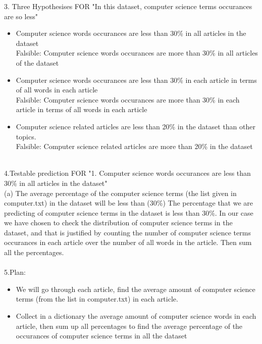 \documentclass{WeSTassignment}
\begin{document}
3. Three Hypothesises FOR "In this dataset, computer science terms occurances are so less" \\
\begin{itemize}
\item Computer science words occurances are less than 30\% in all articles in the dataset \\
Falsible: Computer science words occurances are more than 30\% in all articles of the dataset \\
\item Computer science words occurances are less than 30\% in each article in terms of all words in each article \\
Falsible: Computer science words occurances are more than 30\% in each article in terms of all words in each article \\
\item Computer science related articles are less than 20\% in the dataset than other topics. \\
Falsible: Computer science related articles are more than 20\% in the dataset \\ \\
\end{itemize}
4.Testable prediction FOR "1. Computer science words occurances are less than 30\% in all articles in the dataset" \\
(a) The average percentage of the computer science terms (the list given in computer.txt) in the dataset will be less than (30\%) The percentage that we are predicting of computer science terms in the dataset is less than 30\%. In our case we have chosen to check the distribution of computer science terms in the dataset, and that is justified by counting the number of computer science terms occurances in each article over the number of all words in the article. Then sum all the percentages. \\ \\
5.Plan: \\
\begin{itemize}
\item We will go through each article, find the average amount of computer science terms (from the list in computer.txt) in each article. \\
\item Collect in a dictionary the average amount of computer science words in each article, then sum up all percentages to find the average percentage of the occurances of computer science terms in all the dataset \\
\end{itemize}
\end{document}
